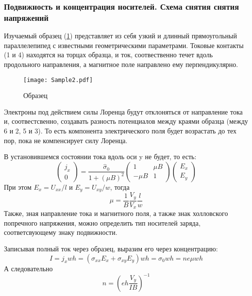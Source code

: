 \subsubsection{Подвижность и концентрация носителей. Схема снятия снятия напряжений}
Изучаемый образец (\ref{fig:sample2}) представляет из себя узкий и длинный прямоугольный параллелепипед с известными геометрическими параметрами. Токовые контакты (1 и 4) находятся на торцах образца, и ток, соотвественно течет вдоль продольного направления, а магнитное поле направлено ему перпендикулярно.

\begin{figure}[H]
	\centering
	\texttt{[image: Sample2.pdf]}
	\caption{Образец}
	\label{fig:sample2}
\end{figure}
Электроны под действием силы Лоренца будут отклоняться от направление тока и, соотвестсвенно, создавать разность потенциалов между краями образца (между 6 и 2, 5 и 3). То есть компонента электрического поля будет возрастать до тех пор, пока не компенсирует силу Лоренца. 

В установившемся состоянии тока вдоль оси y не будет, то есть: 
\begin{equation}
\left(\begin{array}{c}
j_x \\
0
\end{array}\right)=\frac{\hat{\sigma}_{0}}{1+(\mu B)^{2}}\left(\begin{array}{cc}
1 & \mu B \\
-\mu B & 1
\end{array}\right)\left(\begin{array}{c}
E_{x} \\
E_{y}
\end{array}\right)
\end{equation}
При этом $E_x=U_{xx}/l$ и $E_y=U_{xy}/w$, тогда
\begin{equation}
    \mu=\frac{1}{B}\frac{V_y}{V_x}\frac{l}{w}
\end{equation}
Также, зная направление тока и магнитного поля, а также знак холловского попречного напряжения, можно определить тип носителей заряда, соответсвующему знаку подвижности.

Записывая полный ток через образец, выразим его через концентрацию:
\begin{equation}
    I=j_xwh=(\sigma_{xx}E_x+\sigma_{xy}E_y)wh=\sigma_0 wh=ne\mu wh
\end{equation}
А следовательно
\begin{equation}
    n=(eh\frac{V_y}{IB})^{-1}
\end{equation}
